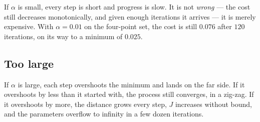 If $\alpha$ is small, every step is short and progress is slow. It is not
\emph{wrong} --- the cost still decreases monotonically, and given enough
iterations it arrives --- it is merely expensive. With $\alpha = 0.01$ on the
four-point set, the cost is still $0.076$ after $120$ iterations, on its way to
a minimum of $0.025$.

\subsection{Too large}

If $\alpha$ is large, each step overshoots the minimum and lands on the far
side. If it overshoots by less than it started with, the process still
converges, in a zig-zag. If it overshoots by more, the distance grows every
step, $J$ increases without bound, and the parameters overflow to infinity in a
few dozen iterations.

